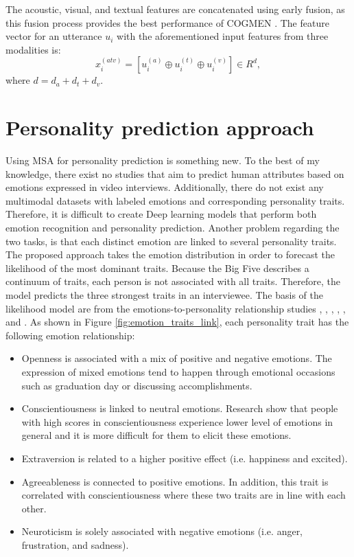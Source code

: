 The acoustic, visual, and textual features are concatenated using early fusion, as this fusion process provides the best performance of COGMEN \cite{COGMEN_joshi-etal-2022-cogmen}. The feature vector for an utterance $u_{i}$ with the aforementioned input features from three modalities is:
%
\begin{equation*}
    x_{i}^{(atv)} = [u_{i}^{(a)} \oplus u_{i}^{(t)} \oplus u_{i}^{(v)}] \in R^{d},
\end{equation*}
%
where $d = d_{a} + d_{t} + d_{v}$. 


\section{Personality prediction approach}
Using MSA for personality prediction is something new. To the best of my knowledge, there exist no studies that aim to predict human attributes based on emotions expressed in video interviews. Additionally, there do not exist any multimodal datasets with labeled emotions and corresponding personality traits. Therefore, it is difficult to create Deep learning models that perform both emotion recognition and personality prediction. Another problem regarding the two tasks, is that each distinct emotion are linked to several personality traits. The proposed approach takes the emotion distribution in order to forecast the likelihood of the most dominant traits. Because the Big Five describes a continuum of traits, each person is not associated with all traits. Therefore, the model predicts the three strongest traits in an interviewee. The basis of the likelihood model are from the emotions-to-personality relationship studies \cite{personality1-deyoung2007between}, \cite{personality-and-emotion-revelle2009personality}, \cite{extraversion1-komulainen2014effect}, \cite{personality_emotions_link}, \cite{personality2-9210819}, and \cite{emotion_personalty_correlation_Zhao2018}. As shown in Figure \ref{fig:emotion_traits_link}, each personality trait has the following emotion relationship:
%
\begin{itemize}
    \item Openness is associated with a mix of positive and negative emotions. The expression of mixed emotions tend to happen through emotional occasions such as graduation day or discussing accomplishments. 
    \item Conscientiousness is linked to neutral emotions. Research show that people with high scores in conscientiousness experience lower level of emotions in general and it is more difficult for them to elicit these emotions. 
    \item Extraversion is related to a higher positive effect (i.e. happiness and excited).
    \item Agreeableness is connected to positive emotions. In addition, this trait is correlated with conscientiousness where these two traits are in line with each other. 
    \item Neuroticism is solely associated with negative emotions (i.e. anger, frustration, and sadness).
\end{itemize}
